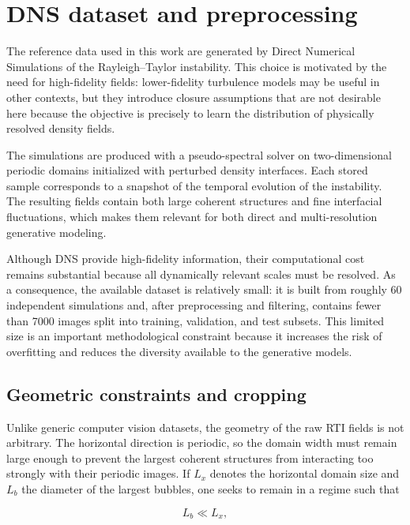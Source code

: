 \section{DNS dataset and preprocessing}

The reference data used in this work are generated by Direct Numerical
Simulations of the Rayleigh--Taylor instability. This choice is motivated by
the need for high-fidelity fields: lower-fidelity turbulence models may be
useful in other contexts, but they introduce closure assumptions that are not
desirable here because the objective is precisely to learn the distribution of
physically resolved density fields.

The simulations are produced with a pseudo-spectral solver on two-dimensional
periodic domains initialized with perturbed density interfaces. Each stored
sample corresponds to a snapshot of the temporal evolution of the instability.
The resulting fields contain both large coherent structures and fine
interfacial fluctuations, which makes them relevant for both direct and
multi-resolution generative modeling.

Although DNS provide high-fidelity information, their computational cost
remains substantial because all dynamically relevant scales must be resolved.
As a consequence, the available dataset is relatively small: it is built from
roughly 60 independent simulations and, after preprocessing and filtering,
contains fewer than 7000 images split into training, validation, and test
subsets. This limited size is an important methodological constraint because it
increases the risk of overfitting and reduces the diversity available to the
generative models.

\subsection{Geometric constraints and cropping}

Unlike generic computer vision datasets, the geometry of the raw RTI fields is
not arbitrary. The horizontal direction is periodic, so the domain width must
remain large enough to prevent the largest coherent structures from interacting
too strongly with their periodic images. If $L_x$ denotes the horizontal
domain size and $L_b$ the diameter of the largest bubbles, one seeks to remain
in a regime such that

\begin{equation}
    L_b \ll L_x,
\end{equation}

